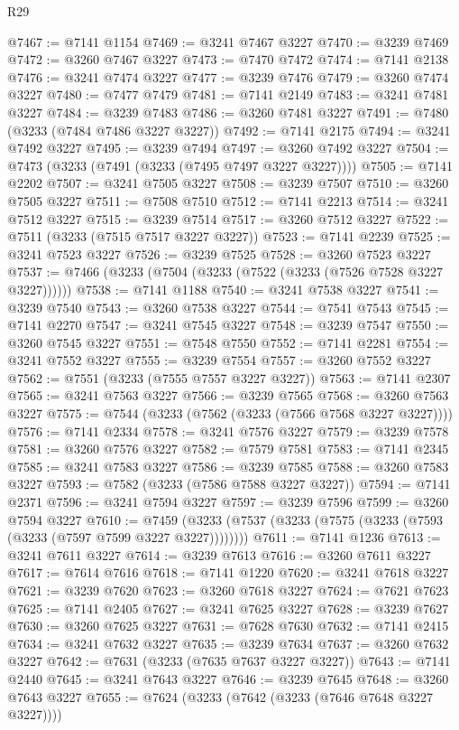 \begin{lexlean}{R29}
\begin{coremodule}
@7467 := @7141 @1154
@7469 := @3241 @7467 @3227
@7470 := @3239 @7469
@7472 := @3260 @7467 @3227
@7473 := @7470 @7472
@7474 := @7141 @2138
@7476 := @3241 @7474 @3227
@7477 := @3239 @7476
@7479 := @3260 @7474 @3227
@7480 := @7477 @7479
@7481 := @7141 @2149
@7483 := @3241 @7481 @3227
@7484 := @3239 @7483
@7486 := @3260 @7481 @3227
@7491 := @7480 (@3233 (@7484 @7486 @3227 @3227))
@7492 := @7141 @2175
@7494 := @3241 @7492 @3227
@7495 := @3239 @7494
@7497 := @3260 @7492 @3227
@7504 := @7473 (@3233 (@7491 (@3233 (@7495 @7497 @3227 @3227))))
@7505 := @7141 @2202
@7507 := @3241 @7505 @3227
@7508 := @3239 @7507
@7510 := @3260 @7505 @3227
@7511 := @7508 @7510
@7512 := @7141 @2213
@7514 := @3241 @7512 @3227
@7515 := @3239 @7514
@7517 := @3260 @7512 @3227
@7522 := @7511 (@3233 (@7515 @7517 @3227 @3227))
@7523 := @7141 @2239
@7525 := @3241 @7523 @3227
@7526 := @3239 @7525
@7528 := @3260 @7523 @3227
@7537 := @7466 (@3233 (@7504 (@3233 (@7522 (@3233 (@7526 @7528 @3227 @3227))))))
@7538 := @7141 @1188
@7540 := @3241 @7538 @3227
@7541 := @3239 @7540
@7543 := @3260 @7538 @3227
@7544 := @7541 @7543
@7545 := @7141 @2270
@7547 := @3241 @7545 @3227
@7548 := @3239 @7547
@7550 := @3260 @7545 @3227
@7551 := @7548 @7550
@7552 := @7141 @2281
@7554 := @3241 @7552 @3227
@7555 := @3239 @7554
@7557 := @3260 @7552 @3227
@7562 := @7551 (@3233 (@7555 @7557 @3227 @3227))
@7563 := @7141 @2307
@7565 := @3241 @7563 @3227
@7566 := @3239 @7565
@7568 := @3260 @7563 @3227
@7575 := @7544 (@3233 (@7562 (@3233 (@7566 @7568 @3227 @3227))))
@7576 := @7141 @2334
@7578 := @3241 @7576 @3227
@7579 := @3239 @7578
@7581 := @3260 @7576 @3227
@7582 := @7579 @7581
@7583 := @7141 @2345
@7585 := @3241 @7583 @3227
@7586 := @3239 @7585
@7588 := @3260 @7583 @3227
@7593 := @7582 (@3233 (@7586 @7588 @3227 @3227))
@7594 := @7141 @2371
@7596 := @3241 @7594 @3227
@7597 := @3239 @7596
@7599 := @3260 @7594 @3227
@7610 := @7459 (@3233 (@7537 (@3233 (@7575 (@3233 (@7593 (@3233 (@7597 @7599 @3227 @3227))))))))
@7611 := @7141 @1236
@7613 := @3241 @7611 @3227
@7614 := @3239 @7613
@7616 := @3260 @7611 @3227
@7617 := @7614 @7616
@7618 := @7141 @1220
@7620 := @3241 @7618 @3227
@7621 := @3239 @7620
@7623 := @3260 @7618 @3227
@7624 := @7621 @7623
@7625 := @7141 @2405
@7627 := @3241 @7625 @3227
@7628 := @3239 @7627
@7630 := @3260 @7625 @3227
@7631 := @7628 @7630
@7632 := @7141 @2415
@7634 := @3241 @7632 @3227
@7635 := @3239 @7634
@7637 := @3260 @7632 @3227
@7642 := @7631 (@3233 (@7635 @7637 @3227 @3227))
@7643 := @7141 @2440
@7645 := @3241 @7643 @3227
@7646 := @3239 @7645
@7648 := @3260 @7643 @3227
@7655 := @7624 (@3233 (@7642 (@3233 (@7646 @7648 @3227 @3227))))

\end{coremodule}
\end{lexlean}
